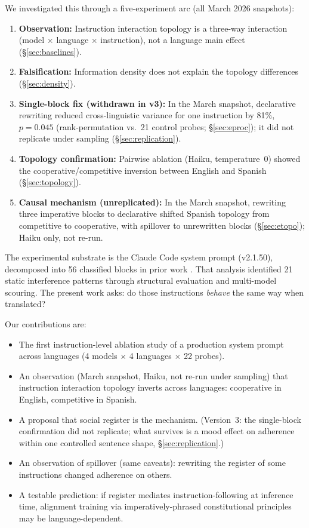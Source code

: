 \documentclass[11pt,a4paper]{article}
\begin{document}
We investigated this through a five-experiment arc (all March 2026 snapshots):

\begin{enumerate}[nosep]
\item \textbf{Observation:} Instruction interaction topology is a
  three-way interaction (model $\times$ language $\times$
  instruction), not a language main effect (\S\ref{sec:baselines}).
\item \textbf{Falsification:} Information density does not explain
  the topology differences (\S\ref{sec:density}).
\item \textbf{Single-block fix (withdrawn in v3):} In the March
  snapshot, declarative rewriting reduced cross-linguistic variance
  for one instruction by 81\%, $p = 0.045$ (rank-permutation vs.\ 21
  control probes; \S\ref{sec:eproc}); it did not replicate under
  sampling (\S\ref{sec:replication}).
\item \textbf{Topology confirmation:} Pairwise ablation (Haiku,
  temperature~0) showed the cooperative/competitive inversion between English and Spanish
  (\S\ref{sec:topology}).
\item \textbf{Causal mechanism (unreplicated):} In the March
  snapshot, rewriting three imperative blocks to declarative shifted
  Spanish topology from competitive to cooperative, with spillover to
  unrewritten blocks (\S\ref{sec:etopo}); Haiku only, not re-run.
\end{enumerate}

The experimental substrate is the Claude Code system prompt (v2.1.50),
decomposed into 56 classified blocks in prior work
\citep{mason2026arbiter}. That analysis identified 21 static
interference patterns through structural evaluation and multi-model
scouring. The present work asks: do those instructions \emph{behave}
the same way when translated?

Our contributions are:
\begin{itemize}[nosep]
\item The first instruction-level ablation study of a production
  system prompt across languages (4 models $\times$ 4 languages
  $\times$ 22 probes).
\item An observation (March snapshot, Haiku, not re-run under
  sampling) that instruction interaction topology inverts across
  languages: cooperative in English, competitive in Spanish.
\item A proposal that social register is the mechanism. (Version~3:
  the single-block confirmation did not replicate; what survives is a
  mood effect on adherence within one controlled sentence shape,
  \S\ref{sec:replication}.)
\item An observation of spillover (same caveats): rewriting the
  register of some instructions changed adherence on others.
\item A testable prediction: if register mediates
  instruction-following at inference time, alignment training via
  imperatively-phrased constitutional principles may be
  language-dependent.
\end{itemize}
\end{document}
